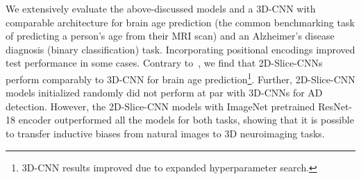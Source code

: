 We extensively evaluate the above-discussed models and a 3D-CNN with comparable architecture for brain age prediction (the common benchmarking task of predicting a person's age from their MRI scan) and an Alzheimer's disease diagnosis (binary classification) task.
Incorporating positional encodings improved test performance in some cases. Contrary to~\cite{gupta2021improved}, we find that 2D-Slice-CNNs perform comparably to 3D-CNN for brain age prediction\footnote{3D-CNN results improved due to expanded hyperparameter search.}. Further, 2D-Slice-CNN models initialized randomly did not perform at par with 3D-CNNs for AD detection. However, the  2D-Slice-CNN models with ImageNet pretrained ResNet-18 encoder outperformed all the models for both tasks, showing that it is possible to transfer inductive biases from natural images to 3D neuroimaging tasks.














